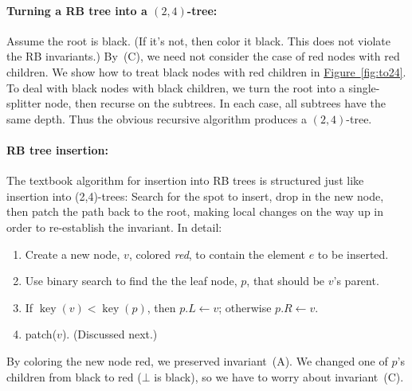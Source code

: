 \documentclass[a4paper]{article}
\DeclareMathOperator{\key}{key}
\newcommand*{\figref}[1]{\hyperref[#1]{Figure~\ref*{#1}}}
\begin{document}
\paragraph{Turning a RB tree into a $(2,4)$-tree:}
Assume the root is black.
(If it's not, then color it black.
This does not violate the RB invariants.)
By~(C), we need not consider the case of red nodes with red children.
We show how to treat black nodes with red children in \figref{fig:to24}.
To deal with black nodes with black children, we turn the root into a single-splitter node, then recurse on the subtrees.
In each case, all subtrees have the same depth.
Thus the obvious recursive algorithm produces a $(2,4)$-tree.

\paragraph{RB tree insertion:}
The textbook algorithm for insertion into RB trees is structured just like insertion into (2,4)-trees:
Search for the spot to insert, drop in the new node, then patch the path back to the root, making local changes on the way up in order to re-establish the invariant.
In detail:
\begin{enumerate}
\item Create a new node, $v$, colored \emph{red}, to contain the element $e$ to be inserted.

\item Use binary search to find the the leaf node, $p$, that should be $v$'s parent.

\item If $\key(v) < \key(p)$, then $p.L \gets v$; otherwise $p.R \gets v$.

\item patch($v$).
(Discussed next.)

\end{enumerate}
By coloring the new node red, we preserved invariant~(A).
We changed one of $p$'s children from black to red ($\bot$ is black), so we have to worry about invariant~(C).
\end{document}
